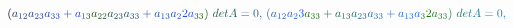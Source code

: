 \documentclass[12pt]{article}
\begin{document}
\begin{displaymath}
{(} \mathcolor[RGB]{30,60,90}{a} _ { \mathcolor[RGB]{30,60,105}{1} \mathcolor[RGB]{30,60,120}{2} } \mathcolor[RGB]{30,60,135}{a} _ { \mathcolor[RGB]{30,60,150}{2} \mathcolor[RGB]{30,60,165}{3} } \mathcolor[RGB]{30,60,180}{a} _ { \mathcolor[RGB]{30,60,195}{3} \mathcolor[RGB]{30,60,210}{3} } \mathcolor[RGB]{30,60,225}{+} \mathcolor[RGB]{30,60,240}{a} _ { \mathcolor[RGB]{30,60,255}{1} \mathcolor[RGB]{30,75,0}{3} } \mathcolor[RGB]{30,75,15}{a} _ { \mathcolor[RGB]{30,75,30}{2} \mathcolor[RGB]{30,75,45}{2} } \mathcolor[RGB]{30,75,60}{a} _ { \mathcolor[RGB]{30,75,75}{2} \mathcolor[RGB]{30,75,90}{3} } \mathcolor[RGB]{30,75,105}{a} _ { \mathcolor[RGB]{30,75,120}{3} \mathcolor[RGB]{30,75,135}{3} } \mathcolor[RGB]{30,75,150}{+} \mathcolor[RGB]{30,75,165}{a} _ { \mathcolor[RGB]{30,75,180}{1} \mathcolor[RGB]{30,75,195}{3} } \mathcolor[RGB]{30,75,210}{a} _ { \mathcolor[RGB]{30,75,225}{2} } \mathcolor[RGB]{30,75,240}{2} \mathcolor[RGB]{30,75,255}{a} _ { \mathcolor[RGB]{30,90,0}{3} \mathcolor[RGB]{30,90,15}{3} } \mathcolor[RGB]{30,90,30}{)} \mathcolor[RGB]{30,90,45}{\operatorname*} { \mathcolor[RGB]{30,90,60}{d} \mathcolor[RGB]{30,90,75}{e} \mathcolor[RGB]{30,90,90}{t} } \mathcolor[RGB]{30,90,105}{A} \mathcolor[RGB]{30,90,120}{=} \mathcolor[RGB]{30,90,135}{0} \mathcolor[RGB]{30,90,150}{,} \mathcolor[RGB]{30,90,165}{\,
(} \mathcolor[RGB]{30,90,180}{a} _ { \mathcolor[RGB]{30,90,195}{1} \mathcolor[RGB]{30,90,210}{2} } \mathcolor[RGB]{30,90,225}{a} _ { \mathcolor[RGB]{30,90,240}{2} } \mathcolor[RGB]{30,90,255}{3} \mathcolor[RGB]{30,105,0}{a} _ { \mathcolor[RGB]{30,105,15}{3} \mathcolor[RGB]{30,105,30}{3} } \mathcolor[RGB]{30,105,45}{+} \mathcolor[RGB]{30,105,60}{a} _ { \mathcolor[RGB]{30,105,75}{1} \mathcolor[RGB]{30,105,90}{3} } \mathcolor[RGB]{30,105,105}{a} _ { \mathcolor[RGB]{30,105,120}{2} \mathcolor[RGB]{30,105,135}{3} } \mathcolor[RGB]{30,105,150}{a} _ { \mathcolor[RGB]{30,105,165}{3} \mathcolor[RGB]{30,105,180}{3} } \mathcolor[RGB]{30,105,195}{+} \mathcolor[RGB]{30,105,210}{a} _ { \mathcolor[RGB]{30,105,225}{1} \mathcolor[RGB]{30,105,240}{3} } \mathcolor[RGB]{30,105,255}{a} _ { \mathcolor[RGB]{30,120,0}{3} } \mathcolor[RGB]{30,120,15}{2} \mathcolor[RGB]{30,120,30}{a} _ { \mathcolor[RGB]{30,120,45}{3} \mathcolor[RGB]{30,120,60}{3} } \mathcolor[RGB]{30,120,75}{)} \mathcolor[RGB]{30,120,90}{\operatorname*} { \mathcolor[RGB]{30,120,105}{d} \mathcolor[RGB]{30,120,120}{e} \mathcolor[RGB]{30,120,135}{t} } \mathcolor[RGB]{30,120,150}{A} \mathcolor[RGB]{30,120,165}{=} \mathcolor[RGB]{30,120,180}{0} \mathcolor[RGB]{30,120,195}{,} \mathcolor[RGB]{30,120,210}{\,
}
\end{displaymath}
\end{document}
